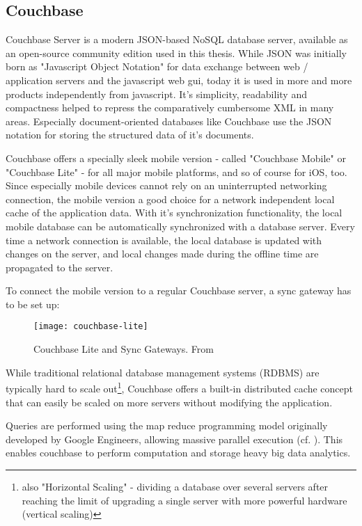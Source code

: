 \subsection{Couchbase}

Couchbase Server \cite{couchbase} is a modern JSON-based NoSQL database server, available as an open-source community edition used in this thesis. While JSON was initially born as "Javascript Object Notation" for data exchange between web / application servers and the javascript web gui, today it is used in more and more products independently from javascript. It's simplicity, readability and compactness helped to repress the comparatively cumbersome XML in many areas. Especially document-oriented databases like Couchbase use the JSON notation for storing the structured data of it's documents.

Couchbase offers a specially sleek mobile version - called "Couchbase Mobile" or "Couchbase Lite" - for all major mobile platforms, and so of course for iOS, too. Since especially mobile devices cannot rely on an uninterrupted networking connection, the mobile version a good choice for a network independent local cache of the application data. With it's synchronization functionality, the local mobile database can be automatically synchronized with a database server. Every time a network connection is available, the local database is updated with changes on the server, and local changes made during the offline time are propagated to the server.

To connect the mobile version to a regular Couchbase server, a sync gateway has to be set up:

\begin{figure}[H]
\centering
\texttt{[image: couchbase-lite]}
\caption{Couchbase Lite and Sync Gateways. From \cite{couchbase-lite}}
\end{figure}

While traditional relational database management systems (RDBMS) are typically hard to scale out\footnote{also "Horizontal Scaling" - dividing a database over several servers after reaching the limit of upgrading a single server with more powerful hardware (vertical scaling)}, Couchbase offers a built-in distributed cache concept that can easily be scaled on more servers without modifying the application.

Queries are performed using the map reduce programming model originally developed by Google Engineers, allowing massive parallel execution (cf. \cite{MapReduceArticle}). This enables couchbase to perform computation and storage heavy big data analytics.

